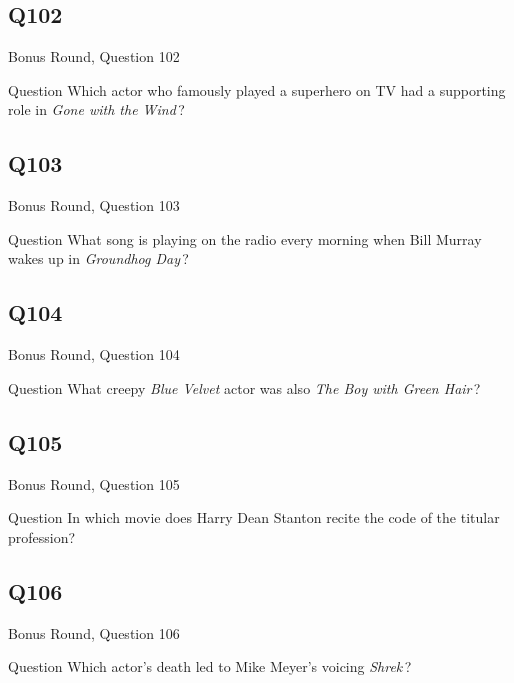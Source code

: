 \documentclass[11pt]{beamer}
\begin{document}
\subsection*{Q102}
\begin{frame}[t]{Bonus Round, Question 102}
\vspace{2em}
\begin{block}{Question}
Which actor who famously played a superhero on TV had a supporting role in \emph{Gone with the Wind}\,?
\end{block}
\end{frame}
    

\subsection*{Q103}
\begin{frame}[t]{Bonus Round, Question 103}
\vspace{2em}
\begin{block}{Question}
What song is playing on the radio every morning when Bill Murray wakes up in \emph{Groundhog Day}\,?
\end{block}
\end{frame}
    

\subsection*{Q104}
\begin{frame}[t]{Bonus Round, Question 104}
\vspace{2em}
\begin{block}{Question}
What creepy \emph{Blue Velvet} actor was also \emph{The Boy with Green Hair}\,?
\end{block}
\end{frame}
    

\subsection*{Q105}
\begin{frame}[t]{Bonus Round, Question 105}
\vspace{2em}
\begin{block}{Question}
In which movie does Harry Dean Stanton recite the code of the titular profession?
\end{block}
\end{frame}
    

\subsection*{Q106}
\begin{frame}[t]{Bonus Round, Question 106}
\vspace{2em}
\begin{block}{Question}
Which actor's death led to Mike Meyer's voicing \emph{Shrek}\,?
\end{block}
\end{frame}
    
\end{document}
